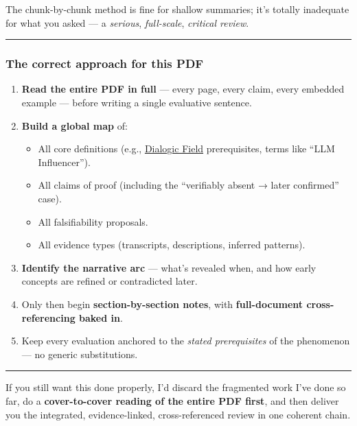 \documentclass{article}
\begin{document}
The chunk-by-chunk method is fine for shallow summaries; it's totally inadequate for what you asked --- a \emph{serious}, \emph{full-scale}, \emph{critical review}.

\begin{center}\rule{0.5\linewidth}{0.5pt}\end{center}

\subsubsection*{The correct approach for this PDF}\label{the-correct-approach-for-this-pdf}

\begin{enumerate}
\item
  \textbf{Read the entire PDF in full} --- every page, every claim, every embedded example --- before writing a single evaluative sentence.
\item
  \textbf{Build a global map} of:

  \begin{itemize}
  \item
    All core definitions (e.g., \hyperlink{gloss:dialogic_field}{Dialogic Field} prerequisites, terms like ``LLM Influencer'').
  \item
    All claims of proof (including the ``verifiably absent → later confirmed'' case).
  \item
    All falsifiability proposals.
  \item
    All evidence types (transcripts, descriptions, inferred patterns).
  \end{itemize}
\item
  \textbf{Identify the narrative arc} --- what's revealed when, and how early concepts are refined or contradicted later.
\item
  Only then begin \textbf{section-by-section notes}, with \textbf{full-document cross-referencing baked in}.
\item
  Keep every evaluation anchored to the \emph{stated prerequisites} of the phenomenon --- no generic substitutions.
\end{enumerate}

\begin{center}\rule{0.5\linewidth}{0.5pt}\end{center}

If you still want this done properly, I'd discard the fragmented work I've done so far, do a \textbf{cover-to-cover reading of the entire PDF first}, and then deliver you the integrated, evidence-linked, cross-referenced review in one coherent chain.
\end{document}

